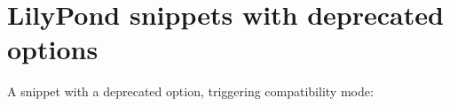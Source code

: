 \documentclass[a4paper, 12pt]{article}
\begin{document}
\section{LilyPond snippets with deprecated options}

A snippet with a deprecated option, triggering compatibility mode:

{%
\parindent 0pt
\noindent
\ifx\preLilyPondExample \undefined
\else
  \expandafter\preLilyPondExample
\fi
\def\lilypondbook{}%

\ifx\postLilyPondExample \undefined
\else
  \expandafter\postLilyPondExample
\fi
}
\end{document}
